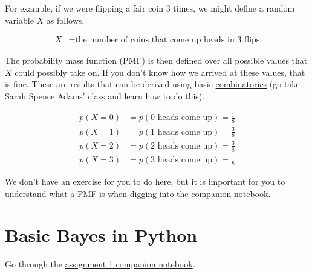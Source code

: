 \documentclass[assignment01_Solutions]{subfiles}
\begin{document}
For example, if we were flipping a fair coin 3 times, we might define a random variable $X$ as follows.

\begin{align}
X&= \mbox{the number of coins that come up heads in 3 flips}
\end{align}

The probability mass function (PMF) is then defined over all possible values that $X$ could possibly take on.  If you don't know how we arrived at these values, that is fine.  These are results that can be derived using basic \href{https://en.wikipedia.org/wiki/Combinatorics}{combinatorics} (go take Sarah Spence Adams' class and learn how to do this).

\begin{align}
p(X=0) &= p(\mbox{0 heads come up}) = \frac{1}{8} \nonumber \\
p(X=1) &= p(\mbox{1 heads come up}) = \frac{3}{8} \nonumber \\
p(X=2) &= p(\mbox{2 heads come up}) = \frac{3}{8} \nonumber \\
p(X=3) &= p(\mbox{3 heads come up}) = \frac{1}{8} \nonumber 
\end{align}

We don't have an exercise for you to do here, but it is important for you to understand what a PMF is when digging into the companion notebook.

\section{Basic Bayes in Python}
\begin{externalresources}[(30 minutes)]
Go through the \href{https://colab.research.google.com/github/mlfa19/assignments/blob/master/Module\%202/01/Assignment_1_Companion_Notebook.ipynb}{assignment 1 companion notebook}.
\end{externalresources}

\end{document}

